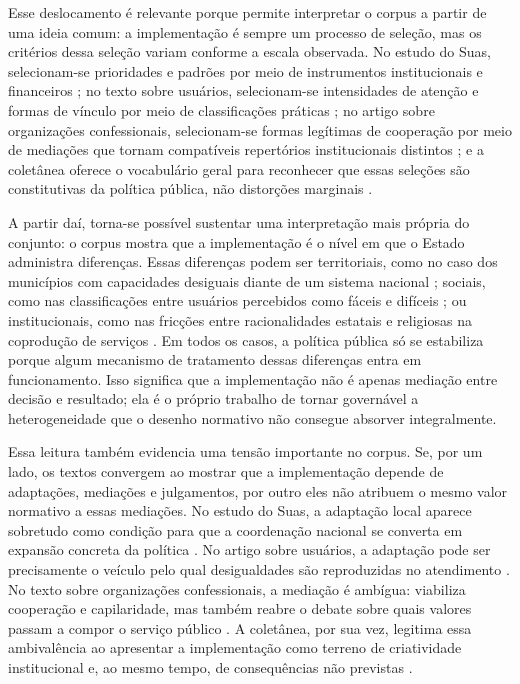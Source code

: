 \documentclass[12pt,a4paper]{article}
\begin{document}
Esse deslocamento é relevante porque permite interpretar o corpus a partir de uma ideia comum: a implementação é sempre um processo de seleção, mas os critérios dessa seleção variam conforme a escala observada. No estudo do Suas, selecionam-se prioridades e padrões por meio de instrumentos institucionais e financeiros \parencite{bichir2020_sistemas_nacionais}; no texto sobre usuários, selecionam-se intensidades de atenção e formas de vínculo por meio de classificações práticas \parencite{lotta2020_categorizando_usuarios}; no artigo sobre organizações confessionais, selecionam-se formas legítimas de cooperação por meio de mediações que tornam compatíveis repertórios institucionais distintos \parencite{lotta2023_jesus_speaks}; e a coletânea oferece o vocabulário geral para reconhecer que essas seleções são constitutivas da política pública, não distorções marginais \parencite{lotta2019_teorias_analises}.

A partir daí, torna-se possível sustentar uma interpretação mais própria do conjunto: o corpus mostra que a implementação é o nível em que o Estado administra diferenças. Essas diferenças podem ser territoriais, como no caso dos municípios com capacidades desiguais diante de um sistema nacional \parencite{bichir2020_sistemas_nacionais}; sociais, como nas classificações entre usuários percebidos como fáceis e difíceis \parencite{lotta2020_categorizando_usuarios}; ou institucionais, como nas fricções entre racionalidades estatais e religiosas na coprodução de serviços \parencite{lotta2023_jesus_speaks}. Em todos os casos, a política pública só se estabiliza porque algum mecanismo de tratamento dessas diferenças entra em funcionamento. Isso significa que a implementação não é apenas mediação entre decisão e resultado; ela é o próprio trabalho de tornar governável a heterogeneidade que o desenho normativo não consegue absorver integralmente.

Essa leitura também evidencia uma tensão importante no corpus. Se, por um lado, os textos convergem ao mostrar que a implementação depende de adaptações, mediações e julgamentos, por outro eles não atribuem o mesmo valor normativo a essas mediações. No estudo do Suas, a adaptação local aparece sobretudo como condição para que a coordenação nacional se converta em expansão concreta da política \parencite{bichir2020_sistemas_nacionais}. No artigo sobre usuários, a adaptação pode ser precisamente o veículo pelo qual desigualdades são reproduzidas no atendimento \parencite{lotta2020_categorizando_usuarios}. No texto sobre organizações confessionais, a mediação é ambígua: viabiliza cooperação e capilaridade, mas também reabre o debate sobre quais valores passam a compor o serviço público \parencite{lotta2023_jesus_speaks}. A coletânea, por sua vez, legitima essa ambivalência ao apresentar a implementação como terreno de criatividade institucional e, ao mesmo tempo, de consequências não previstas \parencite{lotta2019_teorias_analises}.
\end{document}
